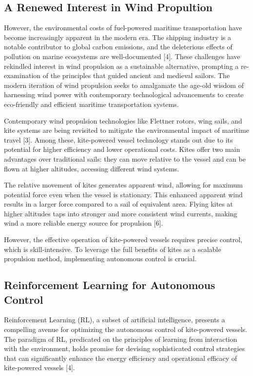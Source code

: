 \subsection{A Renewed Interest in Wind Propultion}
However, the environmental costs of fuel-powered maritime transportation have become increasingly apparent in the modern era. The shipping industry is a notable contributor to global carbon emissions, and the deleterious effects of pollution on marine ecosystems are well-documented [4]. These challenges have rekindled interest in wind propulsion as a sustainable alternative, prompting a re-examination of the principles that guided ancient and medieval sailors. The modern iteration of wind propulsion seeks to amalgamate the age-old wisdom of harnessing wind power with contemporary technological advancements to create eco-friendly and efficient maritime transportation systems.

Contemporary wind propulsion technologies like Flettner rotors, wing sails, and kite systems are being revisited to mitigate the environmental impact of maritime travel [3]. Among these, kite-powered vessel technology stands out due to its potential for higher efficiency and lower operational costs. Kites offer two main advantages over traditional sails: they can move relative to the vessel and can be flown at higher altitudes, accessing different wind systems.

The relative movement of kites generates apparent wind, allowing for maximum potential force even when the vessel is stationary. This enhanced apparent wind results in a larger force compared to a sail of equivalent area. Flying kites at higher altitudes taps into stronger and more consistent wind currents, making wind a more reliable energy source for propulsion [6].

However, the effective operation of kite-powered vessels requires precise control, which is skill-intensive. To leverage the full benefits of kites as a scalable propulsion method, implementing autonomous control is crucial. 

\subsection{Reinforcement Learning for Autonomous Control}
Reinforcement Learning (RL), a subset of artificial intelligence, presents a compelling avenue for optimizing the autonomous control of kite-powered vessels. The paradigm of RL, predicated on the principles of learning from interaction with the environment, holds promise for devising sophisticated control strategies that can significantly enhance the energy efficiency and operational efficacy of kite-powered vessels [4].

